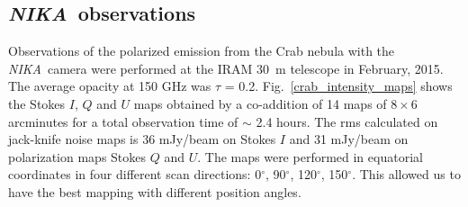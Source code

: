 \documentclass[twocolumn,traditabstract]{aa}
\def\NIKA{\textit{NIKA}}
\begin{document}
\subsection{\NIKA\ observations}\label{sec:nika_observations}
Observations of the polarized emission from the Crab nebula with the \NIKA\ camera were performed at
the IRAM 30~m telescope in February, 2015. The average opacity at 150 GHz was $\tau$ = 0.2.  Fig.~\ref{crab_intensity_maps} shows
the Stokes $I$, $Q$ and $U$ maps obtained by a co-addition of 14 maps
of $8 \times 6$ arcminutes for a total observation time of $\sim$ 2.4 hours. The rms calculated on jack-knife noise maps is 36 mJy/beam on Stokes $I$ and 31 mJy/beam on polarization maps Stokes $Q$ and $U$.
The maps were performed in equatorial coordinates in four different scan
directions: 0$^{\circ}$, 90$^{\circ}$, 120$^{\circ}$, 150$^{\circ}$. This
allowed us to have the best mapping with different position angles.
\end{document}
